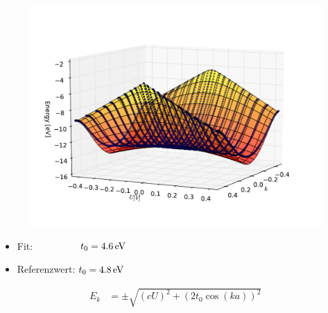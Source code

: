 \begin{frame}
\begin{figure}[]
	\centering
	\includegraphics[width = .8\textwidth]{Images/Hydrogen/charging/3D/figure_1-1}
\end{figure}
\begin{minipage}{0.5\textwidth}
\begin{itemize}
\item Fit: $\hspace*{1.6cm} t_0 = \unit[4.6]{eV}$
\item Referenzwert: $t_0 = \unit[4.8]{eV}$
\end{itemize}
\end{minipage}
\begin{minipage}{0.49\textwidth}
\begin{align*}
E_k &= \pm \sqrt{(cU)^2 + \left(2t_0\cos(ka)\right)^2}
\end{align*}
\end{minipage}
\end{frame}


